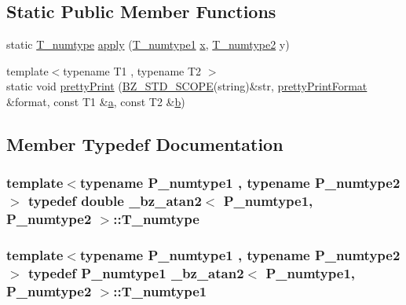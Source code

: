 \subsection*{Static Public Member Functions}
\begin{DoxyCompactItemize}
\item 
static \hyperlink{class__bz__atan2_a90e64330361e1c19af37a2156dcb95f8}{T\+\_\+numtype} \hyperlink{class__bz__atan2_ace9fb9b00298d220a7caadf41b8c315e}{apply} (\hyperlink{class__bz__atan2_a9e08366af14c7f1fbc8d55a49f2bb2da}{T\+\_\+numtype1} \hyperlink{vecnorm1_8cc_ac73eed9e41ec09d58f112f06c2d6cb63}{x}, \hyperlink{class__bz__atan2_a40f7175c4a62b37f7c826c5d16517880}{T\+\_\+numtype2} y)
\item 
{\footnotesize template$<$typename T1 , typename T2 $>$ }\\static void \hyperlink{class__bz__atan2_ae7118ddab109bbe66a6c51dd1a2dcfb4}{pretty\+Print} (\hyperlink{numinquire_8h_a2b24ffc3b4ef9803956bc7715c6c7b83}{B\+Z\+\_\+\+S\+T\+D\+\_\+\+S\+C\+O\+P\+E}(string)\&str, \hyperlink{classprettyPrintFormat}{pretty\+Print\+Format} \&format, const T1 \&\hyperlink{gen__mat5files_8m_aae328bf20413f220e38aec4d95bfd6da}{a}, const T2 \&\hyperlink{gen__mat5files_8m_a7b38767b3b6a8dae167e5afa4fc340b0}{b})
\end{DoxyCompactItemize}


\subsection{Member Typedef Documentation}
\hypertarget{class__bz__atan2_a90e64330361e1c19af37a2156dcb95f8}{}
\subsubsection[{T\+\_\+numtype}]{\setlength{\rightskip}{0pt plus 5cm}template$<$typename P\+\_\+numtype1 , typename P\+\_\+numtype2 $>$ typedef double {\bf \+\_\+bz\+\_\+atan2}$<$ P\+\_\+numtype1, P\+\_\+numtype2 $>$\+::{\bf T\+\_\+numtype}}\label{class__bz__atan2_a90e64330361e1c19af37a2156dcb95f8}
\hypertarget{class__bz__atan2_a9e08366af14c7f1fbc8d55a49f2bb2da}{}
\subsubsection[{T\+\_\+numtype1}]{\setlength{\rightskip}{0pt plus 5cm}template$<$typename P\+\_\+numtype1 , typename P\+\_\+numtype2 $>$ typedef P\+\_\+numtype1 {\bf \+\_\+bz\+\_\+atan2}$<$ P\+\_\+numtype1, P\+\_\+numtype2 $>$\+::{\bf T\+\_\+numtype1}}\label{class__bz__atan2_a9e08366af14c7f1fbc8d55a49f2bb2da}
\hypertarget{class__bz__atan2_a40f7175c4a62b37f7c826c5d16517880}{}
